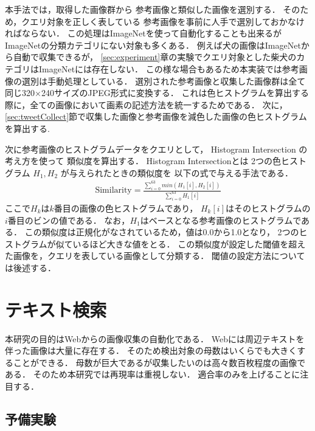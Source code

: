\documentclass{deimj}
\begin{document}
本手法では，取得した画像群から
参考画像と類似した画像を選別する．
そのため，クエリ対象を正しく表している
参考画像を事前に人手で選別しておかなければならない．
この処理はImageNetを使って自動化することも出来るが
ImageNetの分類カテゴリにない対象も多くある．
例えば犬の画像はImageNetから自動で収集できるが，
\ref{sec:experiment}章の実験でクエリ対象とした柴犬のカテゴリはImageNetには存在しない．
この様な場合もあるため本実装では参考画像の選別は手動処理としている．
%
選別された参考画像と収集した画像群は全て同じ320$\times$240サイズのJPEG形式に変換する．
これは色ヒストグラムを算出する際に，全ての画像において画素の記述方法を統一するためである．
次に，\ref{sec:tweetCollect}節で収集した画像と参考画像を減色した画像の色ヒストグラムを算出する.

次に参考画像のヒストグラムデータをクエリとして，
Histogram Intersection
の考え方を使って
類似度を算出する．
Histogram Intersectionとは
2つの色ヒストグラム
$H_1,H_2$
が与えられたときの類似度を
以下の式で与える手法である．
%
\begin{eqnarray}
\mbox{Similarity} = \frac{\sum_{i=0}^{63} min(H_1[i],H_2[i])}{\sum_{i=0}^{63} H_1[i]}
\end{eqnarray}
%
ここで$H_k$は$k$番目の画像の色ヒストグラムであり，
$H_k[i]$はそのヒストグラムの$i$番目のビンの値である．
なお，$H_1$はベースとなる参考画像のヒストグラムである．
この類似度は正規化がなされているため，値は0.0から1.0となり，
2つのヒストグラムが似ているほど大きな値をとる．
この類似度が設定した閾値を超えた画像を，クエリを表している画像として分類する．
閾値の設定方法については後述する．
\section{テキスト検索}
\label{sec:textSearch}

本研究の目的はWebからの画像収集の自動化である．
Webには周辺テキストを伴った画像は大量に存在する．
そのため検出対象の母数はいくらでも大きくすることができる．
母数が巨大であるが収集したいのは高々数百枚程度の画像である．
そのため本研究では再現率は重視しない．
適合率のみを上げることに注目する．

\subsection{予備実験}
\label{sec:yobijikken}
\end{document}
